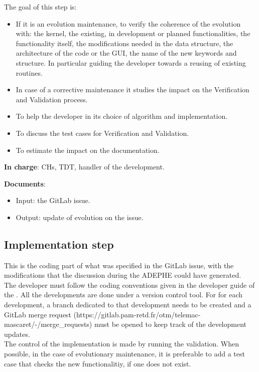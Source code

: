 The goal of this step is:
\begin{itemize}
\item If it is an evolution maintenance, to verify the coherence of the
  evolution with: the kernel, the existing, in development or planned
  functionalities, the functionality itself, the modifications needed in the
  data structure, the architecture of the code or the GUI, the name of the new
  keywords and structure. In particular guiding the developer towards a reusing
  of existing routines.
\item In case of a corrective maintenance it studies the impact on the
  Verification and Validation process.
\item To help the developer in its choice of algorithm and implementation.
\item To discuss the test cases for Verification and Validation.
\item To estimate the impact on the documentation.
\end{itemize}

\textbf{In charge}: CHs, TDT, handler of the development.

\textbf{Documents}:
\begin{itemize}
\item Input: the GitLab issue.
\item Output: update of evolution on the issue.
\end{itemize}

\subsection{Implementation step}

This is the coding part of what was specified in the GitLab issue, with the
modifications that the discussion during the ADEPHE could have generated.\\

The developer must follow the coding conventions given in the developer guide
of the \telemacsystem. All the developments are done under a version control
tool. For for each development, a branch dedicated to that development needs to
be created and a GitLab merge request 
(https://gitlab.pam-retd.fr/otm/telemac-mascaret/-/merge\_requests)
must be opened to keep track of the development updates.\\

The control of the implementation is made by running the \telemacsystem{}
validation. When possible, in the case of evolutionary maintenance, it is
preferable to add a test case that checks the new functionalitiy, if one does
not exist.\\


